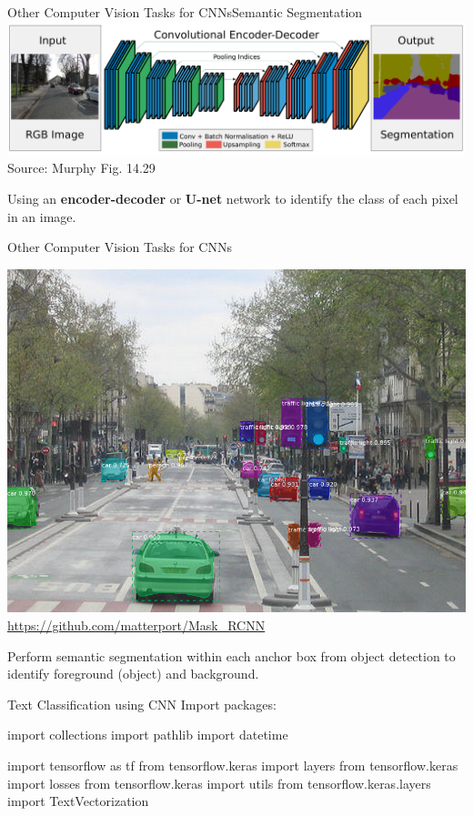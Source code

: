 \documentclass[ignorenonframetext,xcolor=x11names]{beamer}
\begin{document}
\begin{frame}{Other Computer Vision Tasks for CNNs}{Semantic Segmentation}
\includegraphics[width=\textwidth]{screen11.png} \\

\scriptsize Source: Murphy Fig. 14.29
\normalsize
\vspace{\baselineskip}

Using an \textbf{encoder-decoder} or \textbf{U-net} network to identify the class of each pixel in an image.
\end{frame}

\begin{frame}{Other Computer Vision Tasks for CNNs}
\begin{center}
\includegraphics[width=.5\textwidth]{street.png} \\

\scriptsize \url{https://github.com/matterport/Mask_RCNN}
\end{center}

\normalsize
Perform semantic segmentation within each anchor box from object detection to identify foreground (object) and background. 
\end{frame}


\begin{frame}[fragile]{Text Classification using CNN}
Import packages:
\begin{pythoncode}
import collections
import pathlib
import datetime

import tensorflow as tf
from tensorflow.keras import layers
from tensorflow.keras import losses
from tensorflow.keras import utils
from tensorflow.keras.layers import TextVectorization
\end{pythoncode}
\end{frame}
\end{document}
